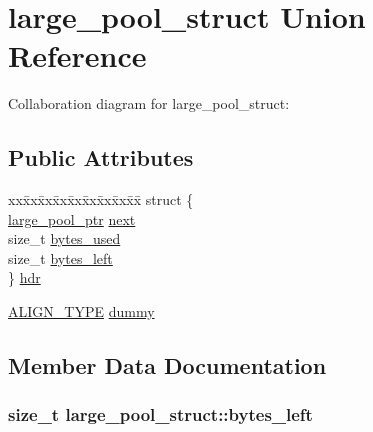 \hypertarget{unionlarge__pool__struct}{}\section{large\+\_\+pool\+\_\+struct Union Reference}
\label{unionlarge__pool__struct}


Collaboration diagram for large\+\_\+pool\+\_\+struct\+:
\subsection*{Public Attributes}
\begin{DoxyCompactItemize}
\item 
\begin{tabbing}
xx\=xx\=xx\=xx\=xx\=xx\=xx\=xx\=xx\=\kill
struct \{\\
\>\hyperlink{jmemmgr_8c_a048418eab2b2022aaa4ec587c48a3089}{large\_pool\_ptr} \hyperlink{unionlarge__pool__struct_af4e2c26179563b175cd134ace99767cf}{next}\\
\>size\_t \hyperlink{unionlarge__pool__struct_a6a809a92d1775c242eba37daabaa4b3b}{bytes\_used}\\
\>size\_t \hyperlink{unionlarge__pool__struct_ab7106ede30ea9d887b1a3620afc1bf6a}{bytes\_left}\\
\} \hyperlink{unionlarge__pool__struct_a92556ba164f9d34c437bd80207c2a29f}{hdr}\\

\end{tabbing}\item 
\hyperlink{jmemmgr_8c_a4781c052bb138f69ef6d60737fd569e3}{A\+L\+I\+G\+N\+\_\+\+T\+Y\+P\+E} \hyperlink{unionlarge__pool__struct_a850fcb897c7fbfb12dd01193fa0c48aa}{dummy}
\end{DoxyCompactItemize}


\subsection{Member Data Documentation}
\hypertarget{unionlarge__pool__struct_ab7106ede30ea9d887b1a3620afc1bf6a}{}
\subsubsection[{bytes\+\_\+left}]{\setlength{\rightskip}{0pt plus 5cm}size\+\_\+t large\+\_\+pool\+\_\+struct\+::bytes\+\_\+left}\label{unionlarge__pool__struct_ab7106ede30ea9d887b1a3620afc1bf6a}
\hypertarget{unionlarge__pool__struct_a6a809a92d1775c242eba37daabaa4b3b}{}

